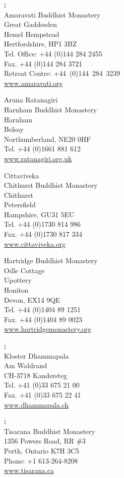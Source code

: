 {\raggedright

\textbf{\MakeUppercase{\textUnitedKingdom}:}\\
Amaravati Buddhist Monastery\\
Great Gaddesden\\
Hemel Hempstead\\
Hertfordshire, HP1 3BZ\\
Tel. Office: +44 (0)144 284 2455\\
Fax. +44 (0)144 284 3721\\
Retreat Centre: \mbox{+44 (0)144 284 3239}\\
\href{http://www.amaravati.org}{www.amaravati.org}

Aruna Ratanagiri\\
Harnham Buddhist Monastery\\
Harnham\\
Belsay\\
Northumberland, NE20 0HF\\
Tel. +44 (0)1661 881 612\\
\href{http://www.ratanagiri.org.uk}{www.ratanagiri.org.uk}

Cittaviveka\\
Chithurst Buddhist Monastery\\
Chithurst\\
Petersfield\\
Hampshire, GU31 5EU\\
Tel. +44 (0)1730 814 986\\
Fax. +44 (0)1730 817 334\\
\href{http://www.cittaviveka.org}{www.cittaviveka.org}

Hartridge Buddhist Monastery\\
Odle Cottage\\
Upottery\\
Honiton\\
Devon, EX14 9QE\\
Tel. +44 (0)1404 89 1251\\
Fax. +44 (0)1404 89 0023\\
\href{http://www.hartridgemonastery.org}{www.hartridgemonastery.org}

\vfill

\textbf{\MakeUppercase{\textSwitzerland}:} \\
Kloster Dhammapala\\
Am Waldrand\\
CH-3718 Kandersteg\\
Tel. +41 (0)33 675 21 00\\
Fax. +41 (0)33 675 22 41\\
\href{http://www.dhammapala.ch}{www.dhammapala.ch}

\vfill

\textbf{\MakeUppercase{\textCanada}:} \\
Tisarana Buddhist Monastery\\
1356 Powers Road, RR \#3\\
Perth, Ontario K7H 3C5\\
Phone: +1 613-264-8208\\
\href{http://www.tisarana.ca}{www.tisarana.ca}

}

